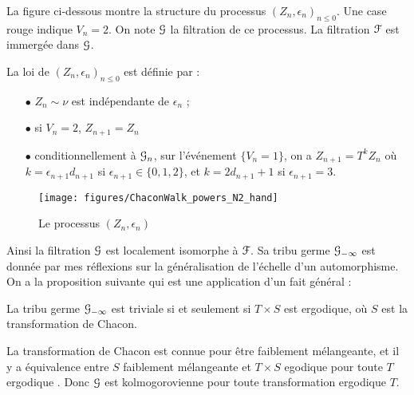 \documentclass[12pt,a4paper]{article}
\begin{document}
La figure ci-dessous montre la structure du processus ${(Z_n, \epsilon_n)}_{n \leq 0}$. 
Une case rouge indique $V_n=2$. 
On note $\EuScript{G}$ la filtration de ce processus. La filtration $\EuScript{F}$ est immergée dans $\EuScript{G}$. 

La loi de ${(Z_n, \epsilon_n)}_{n \leq 0}$ est définie par : 
\begin{itemize}
\item[$\bullet$] $Z_n \sim \nu$ est indépendante de $\epsilon_n$ ;

\item[$\bullet$] si $V_n=2$, $Z_{n+1} = Z_n$ 

\item[$\bullet$] conditionnellement à $\EuScript{G}_n$, sur l'événement $\{V_n=1\}$, 
on a $Z_{n+1} = T^k Z_n$ où $k=\epsilon_{n+1} d_{n+1}$ si $\epsilon_{n+1} \in \{0, 1, 2\}$, 
et $k = 2 d_{n+1} + 1$ si $\epsilon_{n+1}=3$. 
\end{itemize}

\begin{figure}[!h]
\centering
	\texttt{[image: figures/ChaconWalk\_powers\_N2\_hand]}
\caption{Le processus $(Z_n, \epsilon_n)$}\label{fig:Zn}
\end{figure}

Ainsi la filtration $\EuScript{G}$ est localement isomorphe à $\EuScript{F}$. 
Sa tribu germe $\EuScript{G}_{-\infty}$ est donnée par mes réflexions 
sur la généralisation de l'échelle d'un automorphisme. 
On a la proposition suivante qui est une application d'un fait général : 

\begin{ppsition}
La tribu germe $\EuScript{G}_{-\infty}$ est triviale si et seulement si $T\times S$ est ergodique, 
où $S$ est la transformation de Chacon. 
\end{ppsition}

La transformation de Chacon est connue pour être faiblement mélangeante,  
et il y a équivalence entre \og $S$ faiblement mélangeante \fg{} et 
\og $T\times S$ egodique pour toute $T$ ergodique \fg. 
Donc $\EuScript{G}$ est kolmogorovienne pour toute transformation ergodique $T$. 
\end{document}
